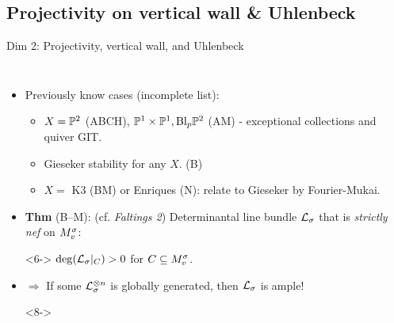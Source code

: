 \documentclass[8pt]{beamer} %
\begin{document}
\subsection{{\color{purple} Projectivity on vertical wall \& Uhlenbeck}}
\begin{frame}[fragile]{Dim 2: Projectivity, vertical wall, and Uhlenbeck}
    \begin{columns}[t]
        \begin{itemize}
            \item<2-> Previously know cases (incomplete list):
            \begin{itemize}
                \item<3-> $X = \mathbb{P}^2$ {\footnotesize (ABCH)}, $\mathbb{P}^1 \times \mathbb{P}^1, \text{Bl}_p \mathbb{P}^2$ {\footnotesize (AM)} - exceptional collections and quiver GIT.
                \item<4-> Gieseker stability for any $X$. {\footnotesize (B)}
                \item<5-> $X = $ K3 {\footnotesize (BM)} or Enriques {\footnotesize (N)}: relate to Gieseker by Fourier-Mukai.
            \end{itemize}
        \item<6-> \textbf{Thm} (B--M): (cf. \textit{Faltings 2}) Determinantal line bundle $\mathcal{L}_\sigma$ that is \textit{strictly nef} on $M^\sigma_v$: %
        \item[]<6-> $\deg(\mathcal{L}_\sigma|_C) > 0$ for $C \subseteq M^\sigma_v$.
        \item<7-> $\Rightarrow$ If some $\mathcal{L}_\sigma^{\otimes n}$ is globally generated, then $\mathcal{L}_\sigma$ is ample!
        \item[]
        \item[]<8->
        \begin{center}
\end{center}
\end{itemize}
\end{columns}
\end{frame}
\end{document}
